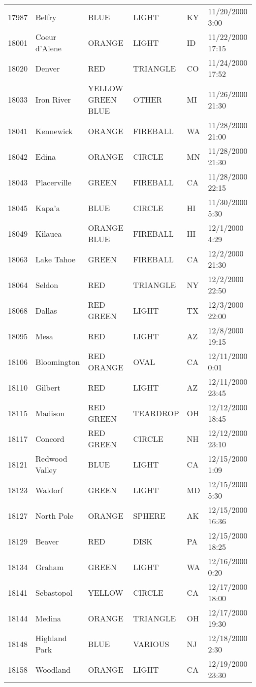 \begin{tabular}{llllll}
17987 & Belfry & BLUE & LIGHT & KY & 11/20/2000 3:00 \\
18001 & Coeur d'Alene & ORANGE & LIGHT & ID & 11/22/2000 17:15 \\
18020 & Denver & RED & TRIANGLE & CO & 11/24/2000 17:52 \\
18033 & Iron River & YELLOW GREEN BLUE & OTHER & MI & 11/26/2000 21:30 \\
18041 & Kennewick & ORANGE & FIREBALL & WA & 11/28/2000 21:00 \\
18042 & Edina & ORANGE & CIRCLE & MN & 11/28/2000 21:30 \\
18043 & Placerville & GREEN & FIREBALL & CA & 11/28/2000 22:15 \\
18045 & Kapa'a & BLUE & CIRCLE & HI & 11/30/2000 5:30 \\
18049 & Kilauea & ORANGE BLUE & FIREBALL & HI & 12/1/2000 4:29 \\
18063 & Lake Tahoe & GREEN & FIREBALL & CA & 12/2/2000 21:30 \\
18064 & Seldon & RED & TRIANGLE & NY & 12/2/2000 22:50 \\
18068 & Dallas & RED GREEN & LIGHT & TX & 12/3/2000 22:00 \\
18095 & Mesa & RED & LIGHT & AZ & 12/8/2000 19:15 \\
18106 & Bloomington & RED ORANGE & OVAL & CA & 12/11/2000 0:01 \\
18110 & Gilbert & RED & LIGHT & AZ & 12/11/2000 23:45 \\
18115 & Madison & RED GREEN & TEARDROP & OH & 12/12/2000 18:45 \\
18117 & Concord & RED GREEN & CIRCLE & NH & 12/12/2000 23:10 \\
18121 & Redwood Valley & BLUE & LIGHT & CA & 12/15/2000 1:09 \\
18123 & Waldorf & GREEN & LIGHT & MD & 12/15/2000 5:30 \\
18127 & North Pole & ORANGE & SPHERE & AK & 12/15/2000 16:36 \\
18129 & Beaver & RED & DISK & PA & 12/15/2000 18:25 \\
18134 & Graham & GREEN & LIGHT & WA & 12/16/2000 0:20 \\
18141 & Sebastopol & YELLOW & CIRCLE & CA & 12/17/2000 18:00 \\
18144 & Medina & ORANGE & TRIANGLE & OH & 12/17/2000 19:30 \\
18148 & Highland Park & BLUE & VARIOUS & NJ & 12/18/2000 2:30 \\
18158 & Woodland & ORANGE & LIGHT & CA & 12/19/2000 23:30 \\

\end{tabular}
